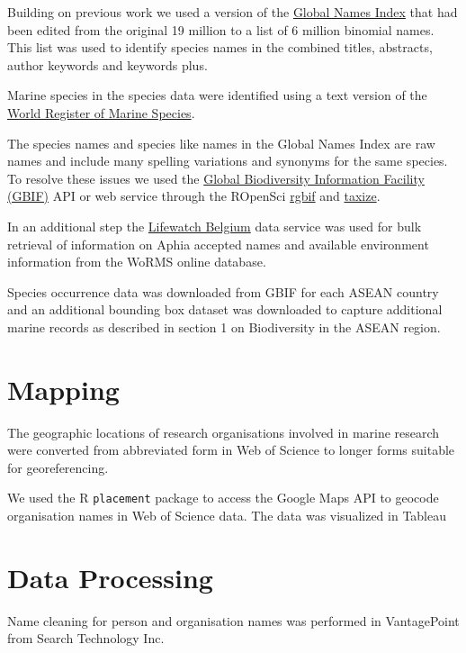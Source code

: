 \documentclass[]{book}
\theoremstyle{definition}
\theoremstyle{definition}
\theoremstyle{definition}
\theoremstyle{remark}
\begin{document}
Building on previous work we used a version of the
\href{http://gni.globalnames.org/}{Global Names Index} that had been
edited from the original 19 million to a list of 6 million binomial
names. This list was used to identify species names in the combined
titles, abstracts, author keywords and keywords plus.

Marine species in the species data were identified using a text version
of the \href{http://www.marinespecies.org/}{World Register of Marine
Species}.

The species names and species like names in the Global Names Index are
raw names and include many spelling variations and synonyms for the same
species. To resolve these issues we used the
\href{https://www.gbif.org/}{Global Biodiversity Information Facility
(GBIF)} API or web service through the ROpenSci \href{}{rgbif} and
\href{}{taxize}.

In an additional step the
\href{http://www.lifewatch.be/data-services/?cache=1521050271}{Lifewatch
Belgium} data service was used for bulk retrieval of information on
Aphia accepted names and available environment information from the
WoRMS online database.

Species occurrence data was downloaded from GBIF for each ASEAN country
and an additional bounding box dataset was downloaded to capture
additional marine records as described in section 1 on Biodiversity in
the ASEAN region.

\hypertarget{mapping}{%
\section{Mapping}\label{mapping}}

The geographic locations of research organisations involved in marine
research were converted from abbreviated form in Web of Science to
longer forms suitable for georeferencing.

We used the R \texttt{placement} package to access the Google Maps API
to geocode organisation names in Web of Science data. The data was
visualized in Tableau

\hypertarget{data-processing}{%
\section{Data Processing}\label{data-processing}}

Name cleaning for person and organisation names was performed in
VantagePoint from Search Technology Inc.
\end{document}
